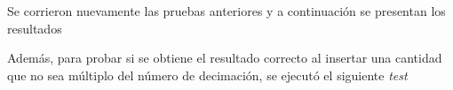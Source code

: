 
Se corrieron nuevamente las pruebas anteriores y a continuación se presentan los resultados



Además, para probar si se obtiene el resultado correcto al insertar una cantidad que no sea múltiplo del número de decimación, se ejecutó el siguiente \emph{test}






